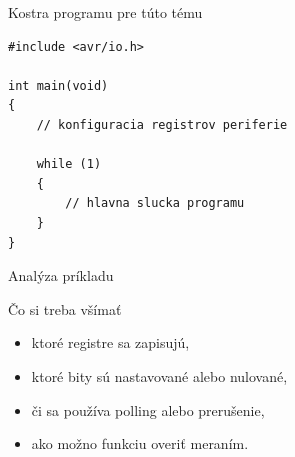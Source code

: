 
\begin{frame}[fragile]{Kostra programu pre túto tému}
\begin{lstlisting}[style=avrstyle]
#include <avr/io.h>

int main(void)
{
    // konfiguracia registrov periferie

    while (1)
    {
        // hlavna slucka programu
    }
}
\end{lstlisting}
\end{frame}

\begin{frame}{Analýza príkladu}
\begin{tukethinbox}{Čo si treba všímať}
\begin{itemize}
    \item ktoré registre sa zapisujú,
    \item ktoré bity sú nastavované alebo nulované,
    \item či sa používa polling alebo prerušenie,
    \item ako možno funkciu overiť meraním.
\end{itemize}
\end{tukethinbox}
\end{frame}
